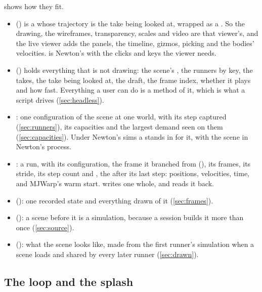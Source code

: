  shows how they fit.

\begin{itemize}
\item \textbf{} () is a  whose trajectory is the take being looked at, wrapped as a . So the drawing, the wireframes, transparency, scales and video are that viewer's, and the live viewer adds the panels, the timeline, gizmos, picking and the bodies' velocities.  is Newton's  with the clicks and keys the viewer needs.
\item \textbf{} () holds everything that is not drawing: the scene's , the runners by key, the takes, the take being looked at, the draft, the frame index, whether it plays and how fast. Everything a user can do is a method of it, which is what a script drives (\cref{sec:headless}).
\item \textbf{}: one configuration of the scene at one world, with its step captured (\cref{sec:runners}), its capacities and the largest demand seen on them (\cref{sec:capacities}). Under Newton's sims a  stands in for it, with the scene in Newton's process.
\item \textbf{}: a run, with its configuration, the frame it branched from (), its frames, its stride, its step count and , the  after its last step: positions, velocities, time, and MJWarp's warm start.  writes one whole, and  reads it back.
\item \textbf{} (): one recorded state and everything drawn of it (\cref{sec:frames}).
\item \textbf{} (): a scene before it is a simulation, because a session builds it more than once (\cref{sec:source}).
\item \textbf{} (): what the scene looks like, made from the first runner's simulation when a scene loads and shared by every later runner (\cref{sec:drawn}).
\end{itemize}

\subsection{The loop and the splash}\label{sec:loop}

